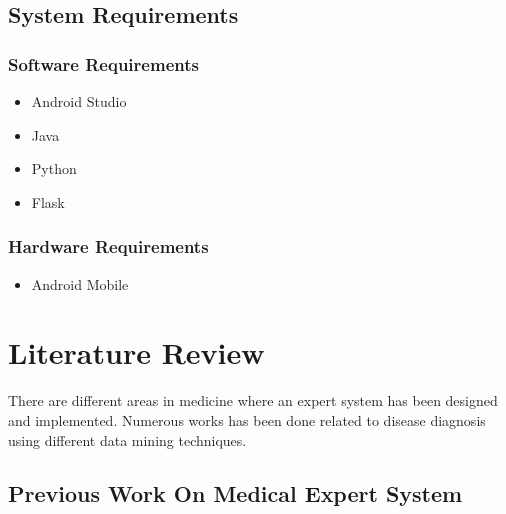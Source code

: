 \section{System Requirements}\label{sec:sr}%
\subsection{Software Requirements}
\begin{itemize}
    \item Android Studio
    \item Java
    \item Python
    \item Flask
\end{itemize}

\subsection{Hardware Requirements}
\begin{itemize}
    \item Android Mobile
\end{itemize}


\chapter{Literature Review}
There are different areas in medicine where an expert system has  been  designed  and  implemented. Numerous works has been done related to disease diagnosis using different data mining techniques. 


\section{Previous Work On Medical Expert System}

